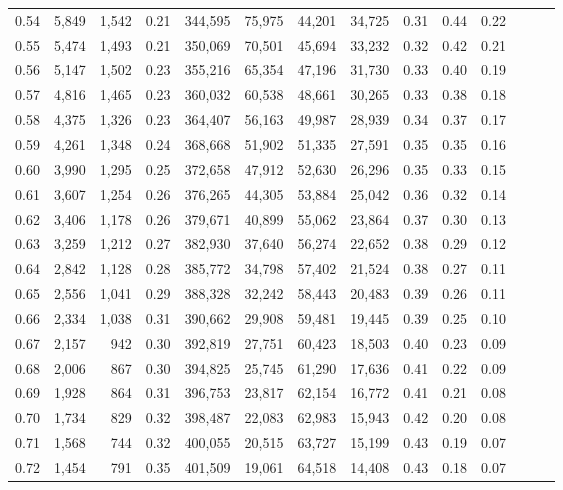 \begin{tabular}{rrrrrrrrrrrrrr}
0.54 &  5,849 &  1,542 &  0.21 &  344,595 &   75,975 &  44,201 &  34,725 &  0.31 &  0.44 &      0.22 \\
0.55 &  5,474 &  1,493 &  0.21 &  350,069 &   70,501 &  45,694 &  33,232 &  0.32 &  0.42 &      0.21 \\
0.56 &  5,147 &  1,502 &  0.23 &  355,216 &   65,354 &  47,196 &  31,730 &  0.33 &  0.40 &      0.19 \\
0.57 &  4,816 &  1,465 &  0.23 &  360,032 &   60,538 &  48,661 &  30,265 &  0.33 &  0.38 &      0.18 \\
0.58 &  4,375 &  1,326 &  0.23 &  364,407 &   56,163 &  49,987 &  28,939 &  0.34 &  0.37 &      0.17 \\
0.59 &  4,261 &  1,348 &  0.24 &  368,668 &   51,902 &  51,335 &  27,591 &  0.35 &  0.35 &      0.16 \\
0.60 &  3,990 &  1,295 &  0.25 &  372,658 &   47,912 &  52,630 &  26,296 &  0.35 &  0.33 &      0.15 \\
0.61 &  3,607 &  1,254 &  0.26 &  376,265 &   44,305 &  53,884 &  25,042 &  0.36 &  0.32 &      0.14 \\
0.62 &  3,406 &  1,178 &  0.26 &  379,671 &   40,899 &  55,062 &  23,864 &  0.37 &  0.30 &      0.13 \\
0.63 &  3,259 &  1,212 &  0.27 &  382,930 &   37,640 &  56,274 &  22,652 &  0.38 &  0.29 &      0.12 \\
0.64 &  2,842 &  1,128 &  0.28 &  385,772 &   34,798 &  57,402 &  21,524 &  0.38 &  0.27 &      0.11 \\
0.65 &  2,556 &  1,041 &  0.29 &  388,328 &   32,242 &  58,443 &  20,483 &  0.39 &  0.26 &      0.11 \\
0.66 &  2,334 &  1,038 &  0.31 &  390,662 &   29,908 &  59,481 &  19,445 &  0.39 &  0.25 &      0.10 \\
0.67 &  2,157 &    942 &  0.30 &  392,819 &   27,751 &  60,423 &  18,503 &  0.40 &  0.23 &      0.09 \\
0.68 &  2,006 &    867 &  0.30 &  394,825 &   25,745 &  61,290 &  17,636 &  0.41 &  0.22 &      0.09 \\
0.69 &  1,928 &    864 &  0.31 &  396,753 &   23,817 &  62,154 &  16,772 &  0.41 &  0.21 &      0.08 \\
0.70 &  1,734 &    829 &  0.32 &  398,487 &   22,083 &  62,983 &  15,943 &  0.42 &  0.20 &      0.08 \\
0.71 &  1,568 &    744 &  0.32 &  400,055 &   20,515 &  63,727 &  15,199 &  0.43 &  0.19 &      0.07 \\
0.72 &  1,454 &    791 &  0.35 &  401,509 &   19,061 &  64,518 &  14,408 &  0.43 &  0.18 &      0.07 \\

\end{tabular}
